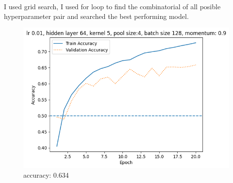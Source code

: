 I used grid search, I used for loop to find the combinatorial of all
posible hyperparameter pair and searched the best performing model.

\begin{figure}[!ht]
    \centering\includegraphics[width=1\linewidth]{A5b-0.png}
    \caption{accuracy: 0.634}
\end{figure}


